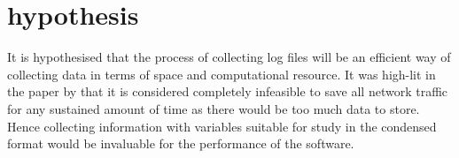\section{hypothesis}


It is hypothesised that the process of collecting log files will be an efficient way of collecting data in terms of space and computational resource. It was high-lit in the \citeyear{staniford2002practical} paper by \citeauthor{staniford2002practical} that it is considered completely infeasible to save all network traffic for any sustained amount of time as there would be too much data to store. Hence collecting information with variables suitable for study in the condensed format would be invaluable for the performance of the software.

